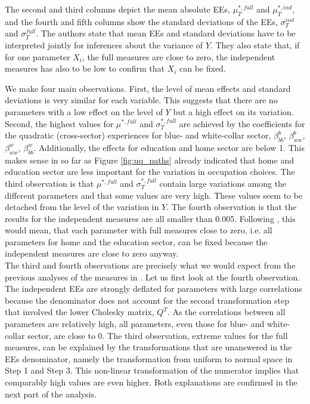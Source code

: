 \noindent
The second and third columns depict the mean absolute EEs, $\mu^{*,full}_T$ and $\mu^{*,ind}_T$, and the fourth and fifth columns show the standard deviations of the EEs, $\sigma^{ind}_T$ and $\sigma^{full}_T$. The authors state that mean EEs and standard deviations have to be interpreted jointly for inferences about the variance of $Y$. They also state that, if for one parameter $X_i$, the full measures are close to zero, the independent measures has also to be low to confirm that $X_i$ can be fixed.

We make four main observations. First, the level of mean effects and standard deviations is very similar for each variable. This suggests that there are no parameters with a low effect on the level  of $Y$ but a high effect on its variation. Second, the highest values for $\mu^{*,full}$ and $\sigma^{*,full}_T$ are achieved by the coefficients for the quadratic (cross-sector) experiences for blue- and white-collar sector, $\beta^b_{bb}$, $\beta^b_{ww}$, $\beta^w_{ww}$, $\beta^w_{bb}$. Additionally, the effects for education and home sector are below 1. This makes sense in so far as Figure \ref{fig:uq_paths} already indicated that home and education sector are less important for the variation in occupation choices. The third observation is that $\mu^{*,full}$ and $\sigma^{*,full}_T$ contain large variations among the different parameters and that some values are very high. These values seem to be detached from the level of the variation in $Y$. The fourth observation is that the results for the independent measures are all smaller than 0.005. Following \cite{ge2014efficient}, this would mean, that each parameter with full measures close to zero, i.e. all parameters for home and the education sector, can be fixed because the independent measures are close to zero anyway.\\

\noindent
The third and fourth observations are precisely what we would expect from the previous analyses of the measures in \cite{ge2017extending}. Let us first look at the fourth observation. The independent EEs are strongly deflated for parameters with large correlations because the denominator does not account for the second transformation step that involved the lower Cholesky matrix, $Q^T$. As the correlations between all parameters are relatively high, all parameters, even those for blue- and white-collar sector, are close to 0. The third observation, extreme values for the full measures, can be explained by the transformations that are unanswered in the EEs denominator, namely the transformation from uniform to normal space in Step 1 and Step 3. This non-linear transformation of the numerator implies that comparably high values are even higher. Both explanations are confirmed in the next part of the analysis.\\

